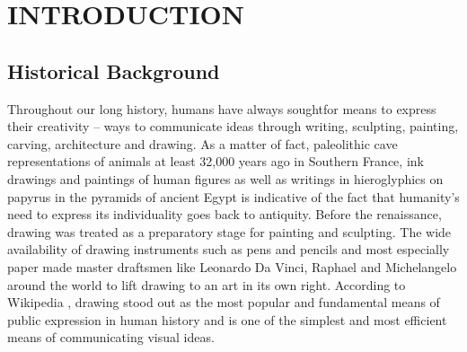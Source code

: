 \chapter{INTRODUCTION} %

\section{Historical Background}
\hspace{30}Throughout our long history, humans have always soughtfor means 
to express their creativity – ways to communicate ideas through writing, 
sculpting, painting, carving, architecture and drawing. As a matter of fact,
paleolithic cave representations of animals at least 32,000 years ago in  
Southern France, ink drawings and paintings of human figures as well as writings 
in hieroglyphics on papyrus in the pyramids of ancient Egypt is
indicative of the fact that humanity's need to express its individuality goes back to
antiquity. Before the renaissance, drawing was treated as a preparatory stage
for painting and sculpting. The wide availability of drawing instruments such as 
pens and pencils and most especially paper made master draftsmen like
Leonardo Da Vinci, Raphael and Michelangelo around the world to lift drawing
to an art in its own right. According to Wikipedia \cite{1}, drawing stood out
 as the most popular and fundamental means of public expression in human history
 and is one of the simplest and most efficient means of communicating visual ideas.\\

